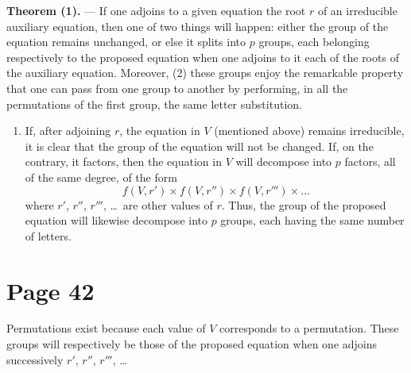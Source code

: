 \documentclass{article}
\begin{document}
\textbf{Theorem (1).} --- If one adjoins to a given equation the root $r$ of an irreducible auxiliary equation, then one of two things will happen: either the group of the equation remains unchanged, or else it splits into $p$ groups, each belonging respectively to the proposed equation when one adjoins to it each of the roots of the auxiliary equation. Moreover, (2) these groups enjoy the remarkable property that one can pass from one group to another by performing, in all the permutations of the first group, the same letter substitution.

\begin{enumerate}
\item If, after adjoining $r$, the equation in $V$ (mentioned above) remains irreducible, it is clear that the group of the equation will not be changed. If, on the contrary, it factors, then the equation in $V$ will decompose into $p$ factors, all of the same degree, of the form
\[
f(V,r') \times f(V,r'') \times f(V,r''') \times \dots
\]
where $r'$, $r''$, $r'''$, \dots\ are other values of $r$. Thus, the group of the proposed equation will likewise decompose into $p$ groups, each having the same number of letters.
\end{enumerate}


\section*{Page 42}

Permutations exist because each value of $V$ corresponds to a permutation. These groups will respectively be those of the proposed equation when one adjoins successively $r'$, $r''$, $r'''$, \dots
\end{document}
